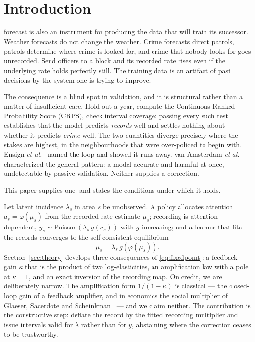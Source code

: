 \documentclass[journal,10pt,twocolumn]{IEEEtran}
\begin{document}
\section{Introduction}
 forecast is also an instrument for producing the data that
will train its successor. Weather forecasts do not change the weather. Crime
forecasts direct patrols, patrols determine where crime is looked for, and crime
that nobody looks for goes unrecorded. Send officers to a block and its recorded
rate rises even if the underlying rate holds perfectly still. The training data is
an artifact of past decisions by the system one is trying to improve.

The consequence is a blind spot in validation, and it is structural rather than a
matter of insufficient care. Hold out a year, compute the Continuous Ranked
Probability Score (CRPS), check interval coverage: passing every such test
establishes that the model predicts \emph{records} well and settles nothing about
whether it predicts \emph{crime} well. The two quantities diverge precisely where
the stakes are highest, in the neighbourhoods that were over-policed to begin
with. Ensign \emph{et al.}~\cite{ensign2018runaway} named the loop and showed it
runs away. van Amsterdam \emph{et al.}~\cite{vanamsterdam2025when} characterized
the general pattern: a model accurate and harmful at once, undetectable by passive
validation. Neither supplies a correction.

This paper supplies one, and states the conditions under which it holds.

Let latent incidence $\lambda_s$ in area $s$ be unobserved. A policy allocates
attention $a_s = \varphi(\mu_s)$ from the recorded-rate estimate $\mu_s$;
recording is attention-dependent, $y_s \sim \mathrm{Poisson}(\lambda_s\, g(a_s))$
with $g$ increasing; and a learner that fits the records converges to the
self-consistent equilibrium
\begin{equation}
\label{eq:fixedpoint}
\mu_s = \lambda_s\, g\!\left(\varphi(\mu_s)\right).
\end{equation}
Section~\ref{sec:theory} develops three consequences of \eqref{eq:fixedpoint}: a
feedback gain $\kappa$ that is the product of two log-elasticities, an
amplification law with a pole at $\kappa = 1$, and an exact inversion of the
recording map. On credit, we are deliberately narrow. The amplification form
$1/(1-\kappa)$ is classical --- the closed-loop gain of a feedback amplifier, and
in economics the social multiplier of Glaeser, Sacerdote and
Scheinkman~\cite{glaeser2003social} --- and we claim neither. The contribution is
the constructive step: deflate the record by the fitted recording multiplier and
issue intervals valid for $\lambda$ rather than for $y$, abstaining where the
correction ceases to be trustworthy.
\end{document}
